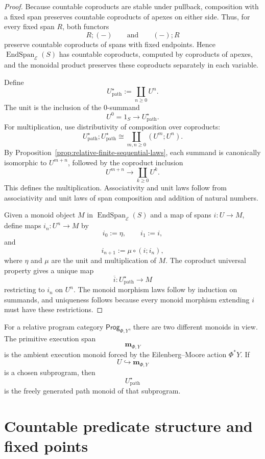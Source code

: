 \begin{proof}
Because countable coproducts are stable under pullback, composition with a
fixed span preserves countable coproducts of apexes on either side. Thus, for
every fixed span \(R\), both functors
\[
R;(-)
\qquad\text{and}\qquad
(-);R
\]
preserve countable coproducts of spans with fixed endpoints. Hence
\(\operatorname{EndSpan}_{\mathcal E}(S)\) has countable coproducts, computed
by coproducts of apexes, and the monoidal product preserves these coproducts
separately in each variable.

Define
\[
U^\star_{\mathrm{path}}:=\coprod_{n\ge0}U^n.
\]
The unit is the inclusion of the \(0\)-summand
\[
U^0=1_S\to U^\star_{\mathrm{path}}.
\]
For multiplication, use distributivity of composition over coproducts:
\[
U^\star_{\mathrm{path}};U^\star_{\mathrm{path}}
\cong
\coprod_{m,n\ge0}(U^m;U^n).
\]
By Proposition~\ref{prop:relative-finite-sequential-laws}, each summand is
canonically isomorphic to \(U^{m+n}\), followed by the coproduct inclusion
\[
U^{m+n}\to\coprod_{k\ge0}U^k.
\]
This defines the multiplication. Associativity and unit laws follow from
associativity and unit laws of span composition and addition of natural
numbers.

Given a monoid object \(M\) in \(\operatorname{EndSpan}_{\mathcal E}(S)\) and
a map of spans \(i:U\to M\), define maps \(i_n:U^n\to M\) by
\[
i_0:=\eta,
\qquad
i_1:=i,
\]
and
\[
i_{n+1}:=\mu\circ(i;i_n),
\]
where \(\eta\) and \(\mu\) are the unit and multiplication of \(M\). The
coproduct universal property gives a unique map
\[
\overline i:U^\star_{\mathrm{path}}\to M
\]
restricting to \(i_n\) on \(U^n\). The monoid morphism laws follow by induction
on summands, and uniqueness follows because every monoid morphism extending
\(i\) must have these restrictions.
\end{proof}

\begin{remark}
\label{rem:relative-two-monoids}
For a relative program category \(\mathsf{Prog}_{\Phi,Y}\), there are two
different monoids in view. The primitive execution span
\[
\mathbf m_{\Phi,Y}
\]
is the ambient execution monoid forced by the Eilenberg--Moore action
\(\Phi^\ast Y\). If
\[
U\hookrightarrow \mathbf m_{\Phi,Y}
\]
is a chosen subprogram, then
\[
U^\star_{\mathrm{path}}
\]
is the freely generated path monoid of that subprogram.
\end{remark}

\section{Countable predicate structure and fixed points}
\label{sec:relative-fixed-points}


